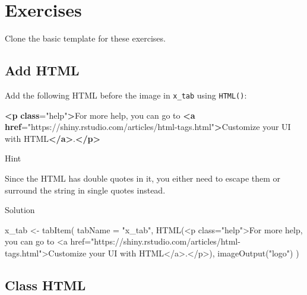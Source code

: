 \documentclass[
]{book}
\newenvironment{Shaded}{\begin{snugshade}}{\end{snugshade}}
\newcommand{\AttributeTok}[1]{\textcolor[rgb]{0.77,0.63,0.00}{#1}}
\newcommand{\ErrorTok}[1]{\textcolor[rgb]{0.64,0.00,0.00}{\textbf{#1}}}
\newcommand{\FunctionTok}[1]{\textcolor[rgb]{0.00,0.00,0.00}{#1}}
\newcommand{\KeywordTok}[1]{\textcolor[rgb]{0.13,0.29,0.53}{\textbf{#1}}}
\newcommand{\NormalTok}[1]{#1}
\newcommand{\OtherTok}[1]{\textcolor[rgb]{0.56,0.35,0.01}{#1}}
\newcommand{\StringTok}[1]{\textcolor[rgb]{0.31,0.60,0.02}{#1}}
\begin{document}
\hypertarget{exercises-web}{%
\section{Exercises}\label{exercises-web}}

Clone the basic template for these exercises.

\hypertarget{add-html}{%
\subsection{Add HTML}\label{add-html}}

Add the following HTML before the image in \texttt{x\_tab} using \texttt{HTML()}:

\begin{Shaded}
\begin{Highlighting}[]
\KeywordTok{\textless{}p} \ErrorTok{class}\OtherTok{=}\StringTok{"help"}\KeywordTok{\textgreater{}}\NormalTok{For more help, you can go to }\KeywordTok{\textless{}a} \ErrorTok{href}\OtherTok{=}\StringTok{"https://shiny.rstudio.com/articles/html{-}tags.html"}\KeywordTok{\textgreater{}}\NormalTok{Customize your UI with HTML}\KeywordTok{\textless{}/a\textgreater{}}\NormalTok{.}\KeywordTok{\textless{}/p\textgreater{}}
\end{Highlighting}
\end{Shaded}

Hint

Since the HTML has double quotes in it, you either need to escape them or surround the string in single quotes instead.

Solution

\begin{Shaded}
\begin{Highlighting}[]
\NormalTok{x\_tab }\OtherTok{\textless{}{-}} \FunctionTok{tabItem}\NormalTok{(}
    \AttributeTok{tabName =} \StringTok{"x\_tab"}\NormalTok{,}
    \FunctionTok{HTML}\NormalTok{(}\StringTok{\textquotesingle{}\textless{}p class="help"\textgreater{}For more help, you can go to \textless{}a href="https://shiny.rstudio.com/articles/html{-}tags.html"\textgreater{}Customize your UI with HTML\textless{}/a\textgreater{}.\textless{}/p\textgreater{}\textquotesingle{}}\NormalTok{),}
    \FunctionTok{imageOutput}\NormalTok{(}\StringTok{"logo"}\NormalTok{)}
\NormalTok{)}
\end{Highlighting}
\end{Shaded}

\hypertarget{class-html}{%
\subsection{Class HTML}\label{class-html}}
\end{document}

